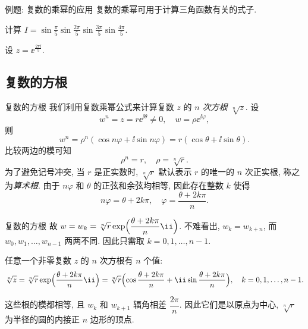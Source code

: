 \begin{frame}{例题: 复数的乘幂的应用\noexer}
	\onslide<+->
	复数的乘幂可用于计算三角函数有关的式子.
	\onslide<+->
	\begin{example}[nearnext]
		计算 $\displaystyle I =\sin\frac{\pi}5\sin\frac{2\pi}5\sin\frac{3\pi}5\sin\frac{4\pi}5$.
	\end{example}
	\onslide<+->
	\begin{solution}[nearprev]
		设 $z=\ee^{\frac{2\pi\ii}5}$.
		\bigdel
	\end{solution}
\end{frame}


\subsection{复数的方根}


\begin{frame}{复数的方根}
	\onslide<+->
	我们利用复数乘幂公式来计算复数 $z$ 的 \emph{$n$ 次方根 $\sqrt[n]z$}.
	\onslide<+->
	设
	\[
		w^n=z=r\ee^{\ii\theta}\neq0,\quad
		w=\rho \ee^{\ii\varphi},
	\]
	\onslide<+->
	则
	\[
		w^n=\rho^n(\cos{n\varphi}+\ii\sin{n\varphi})
		=r(\cos\theta+\ii\sin\theta).
	\]
	\onslide<+->
	比较两边的模可知
	\[
		\rho^n=r,\quad\rho=\sqrt[n]r.
	\]
	\onslide<+->
	为了避免记号冲突, 当 $r$ 是正实数时, $\sqrt[n]r$ 默认表示 $r$ 的唯一的 $n$ 次正实根, 称之为\emph{算术根}.
	\onslide<+->
	由于 $n\varphi$ 和 $\theta$ 的正弦和余弦均相等, 因此存在整数 $k$ 使得
	\[
		n\varphi=\theta+2k\pi,\quad
		\varphi=\frac{\theta+2k\pi}n.
	\]
\end{frame}


\begin{frame}{复数的方根}
	\onslide<+->
	故 $w=w_k=\sqrt[n]r\exp\Bigl(\dfrac{\theta+2k\pi}n\ii\Bigr)$.
	\onslide<+->
	不难看出, $w_k=w_{k+n}$, 而 $w_0,w_1,\dots,w_{n-1}$ 两两不同.
	\onslide<+->
	因此只需取 $k=0,1,\dots,n-1$.
	\onslide<+->
	\begin{theorem}[][复数的方根]
		任意一个非零复数 $z$ 的 $n$ 次方根有 $n$ 个值:
		\[
			\sqrt[n]z=\sqrt[n]r\exp\Bigl(\dfrac{\theta+2k\pi}n\ii\Bigr)\\
			=\sqrt[n]r\Bigl(\cos\frac{\theta+2k\pi}n+\ii\sin\frac{\theta+2k\pi}n\Bigr),\quad k=0,1,\dots,n-1.
		\]
	\end{theorem}
	\onslide<+->
	这些根的模都相等, 且 $w_k$ 和 $w_{k+1}$ 辐角相差 $\dfrac{2\pi}n$.
	\onslide<+->
	因此\alert{它们是以原点为中心, $\sqrt[n]r$ 为半径的圆的内接正 $n$ 边形的顶点}.
\end{frame}


